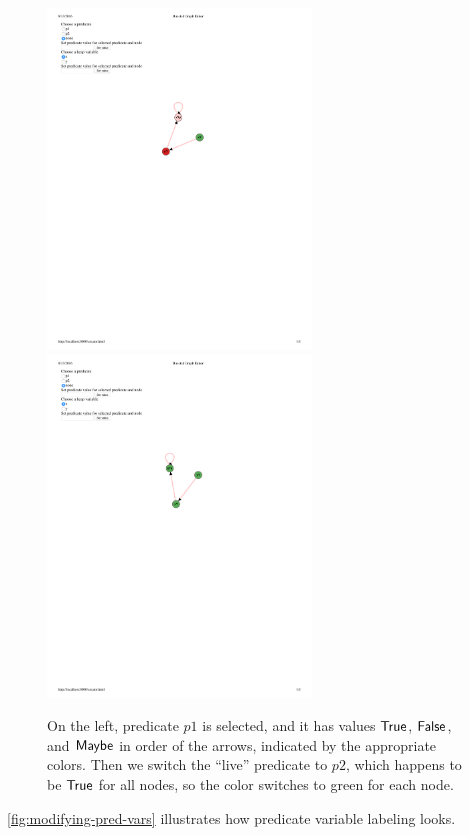 \begin{figure}
  \centering
  \includegraphics[width=7cm]{fig/predvar.pdf}
  \includegraphics[width=7cm]{fig/predvar2.pdf}
  \caption{On the left, predicate $p1$ is selected, and it has values $\mathsf{True}$, $\mathsf{False}$, and $\mathsf{Maybe}$ in order of the arrows, indicated by the appropriate colors. Then we switch the ``live'' predicate to $p2$, which happens to be $\mathsf{True}$ for all nodes, so the color switches to green for each node.}
  \label{fig:modifying-pred-vars}
\end{figure}

\autoref{fig:modifying-pred-vars} illustrates how predicate variable labeling looks.

